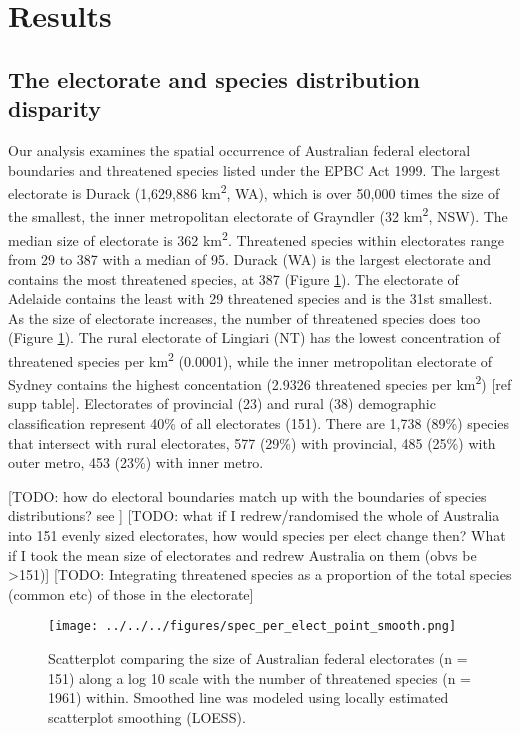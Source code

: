 \documentclass[a4paper,11pt]{article}
\begin{document}
\section{Results}

\subsection{The electorate and species distribution disparity} 

Our analysis examines the spatial occurrence of Australian federal electoral boundaries and threatened species listed under the EPBC Act 1999. The largest electorate is Durack (1,629,886 km\textsuperscript{2}, WA), which is over 50,000 times the size of the smallest, the inner metropolitan electorate of Grayndler (32 km\textsuperscript{2}, NSW). The median size of electorate is 362 km\textsuperscript{2}. Threatened species within electorates range from 29 to 387 with a median of 95. Durack (WA) is the largest electorate and contains the most threatened species, at 387 (Figure \ref{fig:point_smooth}). The electorate of Adelaide contains the least with 29 threatened species and is the 31st smallest. As the size of electorate increases, the number of threatened species does too (Figure \ref{fig:point_smooth}). The rural electorate of Lingiari (NT) has the lowest concentration of threatened species per km\textsuperscript{2} (0.0001), while the inner metropolitan electorate of Sydney contains the highest concentation (2.9326 threatened species per km\textsuperscript{2}) [ref supp table]. Electorates of provincial (23) and rural (38) demographic classification represent 40\% of all electorates (151). There are 1,738 (89\%) species that intersect with rural electorates, 577 (29\%) with provincial, 485 (25\%) with outer metro, 453 (23\%) with inner metro. 

[TODO: how do electoral boundaries match up with the boundaries of species distributions? see \cite{hughesRedlistingRedlistGlobal2019}]
[TODO: what if I redrew/randomised the whole of Australia into 151 evenly sized electorates, how would species per elect change then? What if I took the mean size of electorates and redrew Australia on them (obvs be >151)]
[TODO: Integrating threatened species as a proportion of the total species (common etc) of those in the electorate]

\begin{figure}[H]
	\centering
    \texttt{[image: ../../../figures/spec\_per\_elect\_point\_smooth.png]}
    \caption{Scatterplot comparing the size of Australian federal electorates (n = 151) along a log 10 scale with the number of threatened species (n = 1961) within. Smoothed line was modeled using locally estimated scatterplot smoothing (LOESS).}
    \label{fig:point_smooth}
\end{figure}
\end{document}
